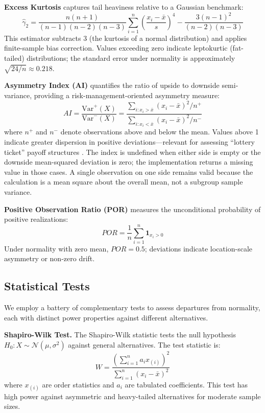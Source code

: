 \documentclass[11pt]{article}
\begin{document}
\textbf{Excess Kurtosis} captures tail heaviness relative to a Gaussian benchmark:
\begin{equation}
    \hat{\gamma}_2 = \frac{n(n+1)}{(n-1)(n-2)(n-3)} \sum_{i=1}^{n} \left( \frac{x_i - \bar{x}}{s} \right)^4 - \frac{3(n-1)^2}{(n-2)(n-3)}
\end{equation}
This estimator subtracts 3 (the kurtosis of a normal distribution) and applies finite-sample bias correction. Values exceeding zero indicate leptokurtic (fat-tailed) distributions; the standard error under normality is approximately $\sqrt{24/n} \approx 0.218$.

\textbf{Asymmetry Index (AI)} quantifies the ratio of upside to downside semi-variance, providing a risk-management-oriented asymmetry measure:
\begin{equation}
    AI = \frac{\text{Var}^+(X)}{\text{Var}^-(X)} = \frac{\sum_{i: x_i > \bar{x}} (x_i - \bar{x})^2 / n^+}{\sum_{i: x_i < \bar{x}} (x_i - \bar{x})^2 / n^-}
    \label{eq:ai}
\end{equation}
where $n^+$ and $n^-$ denote observations above and below the mean. Values above 1 indicate greater dispersion in positive deviations---relevant for assessing ``lottery ticket'' payoff structures \citep{bali2011maxing}.
The index is undefined when either side is empty or the downside mean-squared deviation is zero; the implementation returns a missing value in those cases. A single observation on one side remains valid because the calculation is a mean square about the overall mean, not a subgroup sample variance.

\textbf{Positive Observation Ratio (POR)} measures the unconditional probability of positive realizations:
\begin{equation}
    POR = \frac{1}{n} \sum_{i=1}^{n} \mathbf{1}_{x_i > 0}
\end{equation}
Under normality with zero mean, $POR = 0.5$; deviations indicate location-scale asymmetry or non-zero drift.

\subsection{Statistical Tests}

We employ a battery of complementary tests to assess departures from normality, each with distinct power properties against different alternatives.

\textbf{Shapiro-Wilk Test.} The Shapiro-Wilk statistic \citep{shapiro1965analysis} tests the null hypothesis $H_0: X \sim \mathcal{N}(\mu, \sigma^2)$ against general alternatives. The test statistic is:
\begin{equation}
    W = \frac{\left( \sum_{i=1}^{n} a_i x_{(i)} \right)^2}{\sum_{i=1}^{n} (x_i - \bar{x})^2}
\end{equation}
where $x_{(i)}$ are order statistics and $a_i$ are tabulated coefficients. This test has high power against asymmetric and heavy-tailed alternatives for moderate sample sizes.
\end{document}
